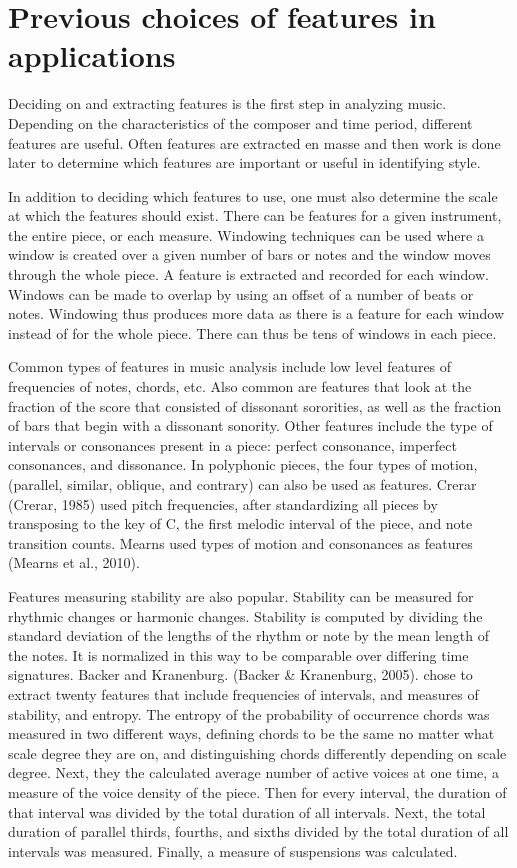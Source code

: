 \documentclass[12pt,twoside]{reedthesis}
\theoremstyle{definition}
\theoremstyle{definition}
\theoremstyle{definition}
\theoremstyle{remark}
\begin{document}
\section{Previous choices of features in
applications}\label{previous-choices-of-features-in-applications}

Deciding on and extracting features is the first step in analyzing
music. Depending on the characteristics of the composer and time period,
different features are useful. Often features are extracted en masse and
then work is done later to determine which features are important or
useful in identifying style.

In addition to deciding which features to use, one must also determine
the scale at which the features should exist. There can be features for
a given instrument, the entire piece, or each measure. Windowing
techniques can be used where a window is created over a given number of
bars or notes and the window moves through the whole piece. A feature is
extracted and recorded for each window. Windows can be made to overlap
by using an offset of a number of beats or notes. Windowing thus
produces more data as there is a feature for each window instead of for
the whole piece. There can thus be tens of windows in each piece.

Common types of features in music analysis include low level features of
frequencies of notes, chords, etc. Also common are features that look at
the fraction of the score that consisted of dissonant sororities, as
well as the fraction of bars that begin with a dissonant sonority. Other
features include the type of intervals or consonances present in a
piece: perfect consonance, imperfect consonances, and dissonance. In
polyphonic pieces, the four types of motion, (parallel, similar,
oblique, and contrary) can also be used as features. Crerar (Crerar,
1985) used pitch frequencies, after standardizing all pieces by
transposing to the key of C, the first melodic interval of the piece,
and note transition counts. Mearns used types of motion and consonances
as features (Mearns et al., 2010).

Features measuring stability are also popular. Stability can be measured
for rhythmic changes or harmonic changes. Stability is computed by
dividing the standard deviation of the lengths of the rhythm or note by
the mean length of the notes. It is normalized in this way to be
comparable over differing time signatures. Backer and Kranenburg.
(Backer \& Kranenburg, 2005). chose to extract twenty features that
include frequencies of intervals, and measures of stability, and
entropy. The entropy of the probability of occurrence chords was
measured in two different ways, defining chords to be the same no matter
what scale degree they are on, and distinguishing chords differently
depending on scale degree. Next, they the calculated average number of
active voices at one time, a measure of the voice density of the piece.
Then for every interval, the duration of that interval was divided by
the total duration of all intervals. Next, the total duration of
parallel thirds, fourths, and sixths divided by the total duration of
all intervals was measured. Finally, a measure of suspensions was
calculated.
\end{document}
